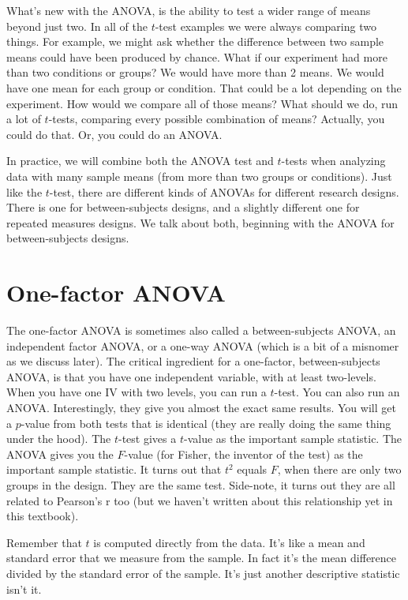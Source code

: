 \documentclass[
]{book}
\begin{document}
What's new with the ANOVA, is the ability to test a wider range of means beyond just two. In all of the \(t\)-test examples we were always comparing two things. For example, we might ask whether the difference between two sample means could have been produced by chance. What if our experiment had more than two conditions or groups? We would have more than 2 means. We would have one mean for each group or condition. That could be a lot depending on the experiment. How would we compare all of those means? What should we do, run a lot of \(t\)-tests, comparing every possible combination of means? Actually, you could do that. Or, you could do an ANOVA.

In practice, we will combine both the ANOVA test and \(t\)-tests when analyzing data with many sample means (from more than two groups or conditions). Just like the \(t\)-test, there are different kinds of ANOVAs for different research designs. There is one for between-subjects designs, and a slightly different one for repeated measures designs. We talk about both, beginning with the ANOVA for between-subjects designs.

\section{One-factor ANOVA}\label{one-factor-anova}

The one-factor ANOVA is sometimes also called a between-subjects ANOVA, an independent factor ANOVA, or a one-way ANOVA (which is a bit of a misnomer as we discuss later). The critical ingredient for a one-factor, between-subjects ANOVA, is that you have one independent variable, with at least two-levels. When you have one IV with two levels, you can run a \(t\)-test. You can also run an ANOVA. Interestingly, they give you almost the exact same results. You will get a \(p\)-value from both tests that is identical (they are really doing the same thing under the hood). The \(t\)-test gives a \(t\)-value as the important sample statistic. The ANOVA gives you the \(F\)-value (for Fisher, the inventor of the test) as the important sample statistic. It turns out that \(t^2\) equals \(F\), when there are only two groups in the design. They are the same test. Side-note, it turns out they are all related to Pearson's r too (but we haven't written about this relationship yet in this textbook).

Remember that \(t\) is computed directly from the data. It's like a mean and standard error that we measure from the sample. In fact it's the mean difference divided by the standard error of the sample. It's just another descriptive statistic isn't it.
\end{document}
